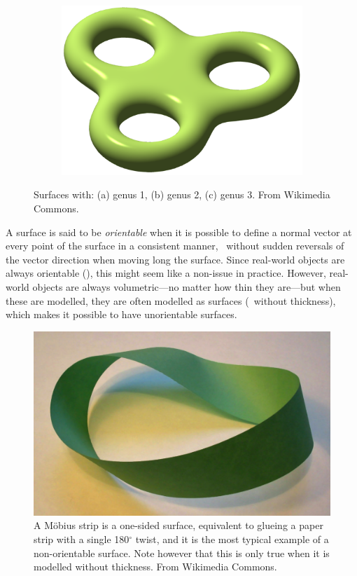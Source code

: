 \begin{figure}
\quad
\begin{subfigure}[b]{0.3\linewidth}
\includegraphics[width=\linewidth]{figs/genus3}
\caption{}%
\label{subfig:genus3}
\end{subfigure}
\caption{Surfaces with: (a) genus 1, (b) genus 2, (c) genus 3. From Wikimedia Commons.}%
\label{fig:genus}
\end{figure}

A surface is said to be \emph{orientable} when it is possible to define a normal vector at every point of the surface in a consistent manner, \ie\ without sudden reversals of the vector direction when moving long the surface.
Since real-world objects are always orientable (), this might seem like a non-issue in practice.
However, real-world objects are always volumetric---no matter how thin they are---but when these are modelled, they are often modelled as surfaces (\ie\ without thickness), which makes it possible to have unorientable surfaces.

\begin{figure}
\centering
\includegraphics[width=0.4\linewidth]{figs/mobius}
\caption{A M\"obius strip is a one-sided surface, equivalent to glueing a paper strip with a single 180\(^\circ\) twist, and it is the most typical example of a non-orientable surface. Note however that this is only true when it is modelled without thickness. From Wikimedia Commons.}%
\label{fig:mobius}
\end{figure}

